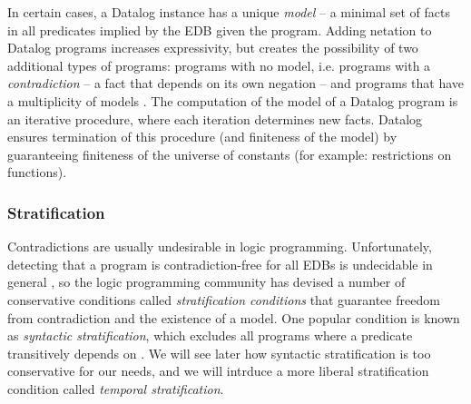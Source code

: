 In certain cases, a Datalog instance has a unique {\em model}  -- a minimal set of facts in all predicates implied by the EDB given the program.  Adding netation to Datalog programs increases expressivity, but creates the possibility of two additional types of programs: programs with no model, i.e. programs with a {\em contradiction} -- a fact that depends on its own negation -- and programs that have a multiplicity of models .  The computation of the model of a Datalog program is an iterative procedure, where each iteration determines new facts.  Datalog ensures termination of this procedure (and finiteness of the model) by guaranteeing finiteness of the universe of constants (for example: restrictions on functions).


\subsubsection{Stratification}
Contradictions are usually undesirable in logic programming. 
 
  Unfortunately, detecting that a program is contradiction-free for all EDBs is undecidable in general , so the logic programming community has devised a number of conservative conditions called {\em stratification conditions} that guarantee freedom from contradiction and the existence of a model.  One popular condition is known as {\em syntactic stratification}, which excludes all programs where a predicate  transitively depends on .  We will see later how syntactic stratification is too conservative for our needs, and we will intrduce a more liberal stratification condition called {\em temporal stratification}.

